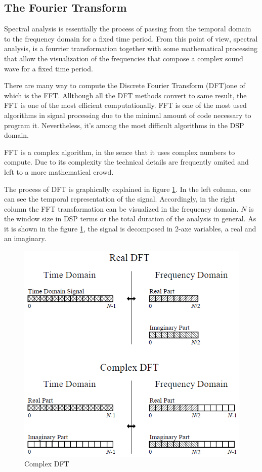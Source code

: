 \subsection{The Fourier Transform}

Spectral analysis is essentially the process of passing from the temporal domain to the frequency domain for a fixed time period. From this point of view, spectral analysis, is a fourrier transformation together with some mathematical processing that allow the visualization of the frequencies that compose a complex sound wave for a fixed time period.

There are many way to compute the Discrete Fourier Transform (DFT)one of which is the FFT. Allthough all the DFT methods convert to same result, the FFT is one of the most efficient computationally. FFT is one of the most used algorithms in signal processing due to the minimal amount of code necessary to program it. Nevertheless, it's among the most difficult algorithms in the DSP domain.

FFT is a complex algorithm, in the sence that it uses complex numbers to compute. Due to its complexity the technical details are frequently omited and left to a more mathematical crowd.

The process of DFT is graphically explained in figure \ref{ComplexDFT}. In the left column, one can see the temporal representation of the signal. Accordingly, in the right column the FFT transformation can be visualized in the frequency domain. $N$ is the window size in DSP terms or the total duration of the analysis in general. As it is shown in the figure \ref{ComplexDFT}, the signal is decomposed in 2-axe variables, a real and an imaginary.


\begin{figure}
    \centering
    \includegraphics[width = 0.5 \textwidth ]{Graphs/ComplexDFT.png}
    \caption{Complex DFT}
    \label{ComplexDFT}
\end{figure}




